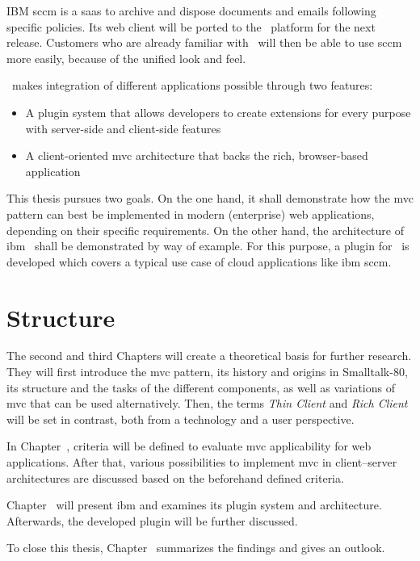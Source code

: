 IBM \ac{sccm} is a \ac{saas} to archive and dispose documents and emails following specific policies. Its web client will be ported to the \nexus\ platform for the next release. Customers who are already familiar with \nexus\ will then be able to use \ac{sccm} more easily, because of the unified look and feel.

\nexus\ makes integration of different applications possible through two features:
\begin{itemize}
	\item A plugin system that allows developers to create extensions for every purpose with server-side and client-side features
	\item A client-oriented \ac{mvc} architecture that backs the rich, browser-based application
\end{itemize}

This thesis pursues two goals. On the one hand, it shall demonstrate how the \ac{mvc} pattern can best be implemented in modern (enterprise) web applications, depending on their specific requirements. On the other hand, the architecture of \ac{ibm} \nexus\ shall be demonstrated by way of example.  For this purpose, a plugin for \nexus\ is developed which covers a typical use case of cloud applications like \ac{ibm} \acl{sccm}.



\section{Structure}
The second and third Chapters will create a theoretical basis for further research. They will first introduce the \acl{mvc} pattern, its history and origins in \mbox{Smalltalk-80}, its structure and the tasks of the different components, as well as variations of \ac{mvc} that can be used alternatively. Then, the terms \emph{Thin Client} and \emph{Rich Client} will be set in contrast, both from a technology and a user perspective.

In Chapter~, criteria will be defined to evaluate \ac{mvc} applicability for web applications. After that, various possibilities to implement \ac{mvc} in client--server architectures are discussed based on the beforehand defined criteria.

Chapter~ will present \ac{ibm} \nexus and examines its plugin system and architecture. Afterwards, the developed plugin will be further discussed.

To close this thesis, Chapter~ summarizes the findings and gives an outlook.


